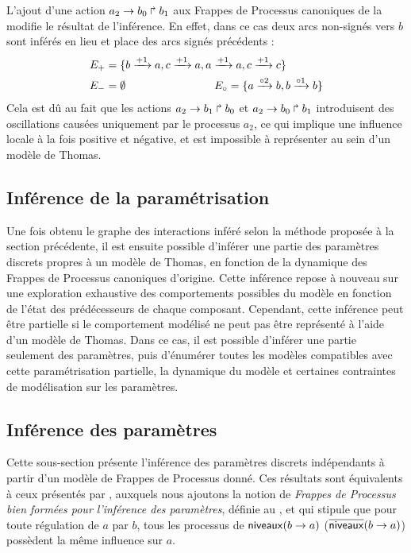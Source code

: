 \begin{example}
  L'ajout d'une action $a_2\rightarrow b_0\Rsh b_1$ aux Frappes de Processus canoniques de la
   modifie le résultat de l'inférence.
  En effet, dans ce cas deux arcs non-signés vers $b$ sont inférés en lieu et place
  des arcs signés précédents :
  \begin{align*}
    E_+ &= \{b \xrightarrow{+ 1} a, c \xrightarrow{+ 1} a, a \xrightarrow{+ 1} a, c \xrightarrow{+ 1} c\}\\
    E_- &= \emptyset \qquad\qquad\qquad\qquad
    E_\circ = \{a \xrightarrow{\circ 2} b, b \xrightarrow{\circ 1} b\}
  \end{align*}
  Cela est dû au fait que les actions $a_2\rightarrow b_1\Rsh b_0$ et $a_2\rightarrow b_0\Rsh b_1$
  introduisent des oscillations causées uniquement par le processus $a_2$,
  ce qui implique une influence locale à la fois positive et négative,
  et est impossible à représenter au sein d'un modèle de Thomas.
\end{example}








\subsection{Inférence de la paramétrisation}

Une fois obtenu le graphe des interactions inféré selon la méthode proposée à la section
précédente, il est ensuite possible d'inférer une partie des paramètres discrets
propres à un modèle de Thomas, en fonction de la dynamique des Frappes de Processus canoniques
d'origine.
Cette inférence repose à nouveau sur une exploration exhaustive des comportements possibles
du modèle en fonction de l'état des prédécesseurs de chaque composant.
Cependant, cette inférence peut être partielle si le comportement modélisé
ne peut pas être représenté à l'aide d'un modèle de Thomas.
Dans ce cas, il est possible d'inférer une partie seulement des paramètres,
puis d'énumérer toutes les modèles compatibles avec cette paramétrisation partielle,
la dynamique du modèle et certaines contraintes de modélisation sur les paramètres.

\subsection{Inférence des paramètres}

Cette sous-section présente l'inférence des paramètres discrets indépendants
à partir d'un modèle de Frappes de Processus donné.
Ces résultats sont équivalents à ceux présentés par ,
auxquels nous ajoutons la notion de \emph{Frappes de Processus bien formées
pour l'inférence des paramètres}, définie au ,
et qui stipule que pour toute régulation de $a$ par $b$,
tous les processus de $\mathsf{niveaux}(b\rightarrow a)$ (\resp $\overline{\mathsf{niveaux}}(b\rightarrow a)$)
possèdent la même influence sur $a$.

